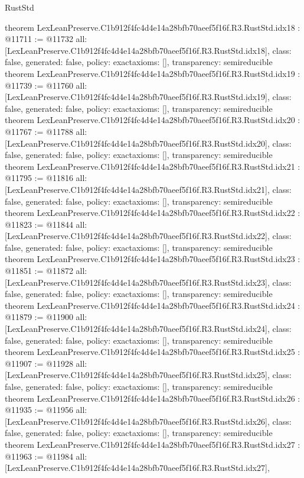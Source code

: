 \begin{lexlean}{RustStd}
\begin{coremodule}
theorem LexLeanPreserve.C1b912f4fc4d4e14a28bfb70aeef5f16f.R3.RustStd.idx18 : @11711 := @11732 {
  all: [LexLeanPreserve.C1b912f4fc4d4e14a28bfb70aeef5f16f.R3.RustStd.idx18],
  class: false,
  generated: false,
  policy: exact{axioms: []},
  transparency: semireducible
}
theorem LexLeanPreserve.C1b912f4fc4d4e14a28bfb70aeef5f16f.R3.RustStd.idx19 : @11739 := @11760 {
  all: [LexLeanPreserve.C1b912f4fc4d4e14a28bfb70aeef5f16f.R3.RustStd.idx19],
  class: false,
  generated: false,
  policy: exact{axioms: []},
  transparency: semireducible
}
theorem LexLeanPreserve.C1b912f4fc4d4e14a28bfb70aeef5f16f.R3.RustStd.idx20 : @11767 := @11788 {
  all: [LexLeanPreserve.C1b912f4fc4d4e14a28bfb70aeef5f16f.R3.RustStd.idx20],
  class: false,
  generated: false,
  policy: exact{axioms: []},
  transparency: semireducible
}
theorem LexLeanPreserve.C1b912f4fc4d4e14a28bfb70aeef5f16f.R3.RustStd.idx21 : @11795 := @11816 {
  all: [LexLeanPreserve.C1b912f4fc4d4e14a28bfb70aeef5f16f.R3.RustStd.idx21],
  class: false,
  generated: false,
  policy: exact{axioms: []},
  transparency: semireducible
}
theorem LexLeanPreserve.C1b912f4fc4d4e14a28bfb70aeef5f16f.R3.RustStd.idx22 : @11823 := @11844 {
  all: [LexLeanPreserve.C1b912f4fc4d4e14a28bfb70aeef5f16f.R3.RustStd.idx22],
  class: false,
  generated: false,
  policy: exact{axioms: []},
  transparency: semireducible
}
theorem LexLeanPreserve.C1b912f4fc4d4e14a28bfb70aeef5f16f.R3.RustStd.idx23 : @11851 := @11872 {
  all: [LexLeanPreserve.C1b912f4fc4d4e14a28bfb70aeef5f16f.R3.RustStd.idx23],
  class: false,
  generated: false,
  policy: exact{axioms: []},
  transparency: semireducible
}
theorem LexLeanPreserve.C1b912f4fc4d4e14a28bfb70aeef5f16f.R3.RustStd.idx24 : @11879 := @11900 {
  all: [LexLeanPreserve.C1b912f4fc4d4e14a28bfb70aeef5f16f.R3.RustStd.idx24],
  class: false,
  generated: false,
  policy: exact{axioms: []},
  transparency: semireducible
}
theorem LexLeanPreserve.C1b912f4fc4d4e14a28bfb70aeef5f16f.R3.RustStd.idx25 : @11907 := @11928 {
  all: [LexLeanPreserve.C1b912f4fc4d4e14a28bfb70aeef5f16f.R3.RustStd.idx25],
  class: false,
  generated: false,
  policy: exact{axioms: []},
  transparency: semireducible
}
theorem LexLeanPreserve.C1b912f4fc4d4e14a28bfb70aeef5f16f.R3.RustStd.idx26 : @11935 := @11956 {
  all: [LexLeanPreserve.C1b912f4fc4d4e14a28bfb70aeef5f16f.R3.RustStd.idx26],
  class: false,
  generated: false,
  policy: exact{axioms: []},
  transparency: semireducible
}
theorem LexLeanPreserve.C1b912f4fc4d4e14a28bfb70aeef5f16f.R3.RustStd.idx27 : @11963 := @11984 {
  all: [LexLeanPreserve.C1b912f4fc4d4e14a28bfb70aeef5f16f.R3.RustStd.idx27],
}
\end{coremodule}
\end{lexlean}
